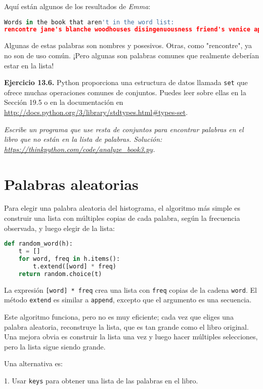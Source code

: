 Aquí están algunos de los resultados de \textit{Emma}:

\begin{lstlisting}[language=Python]
Words in the book that aren't in the word list:
rencontre jane's blanche woodhouses disingenuousness friend's venice apartment ...
\end{lstlisting}

Algunas de estas palabras son nombres y posesivos. Otras, como "rencontre", ya no son de uso común. ¡Pero algunas son palabras comunes que realmente deberían estar en la lista!

\textbf{Ejercicio 13.6.} Python proporciona una estructura de datos llamada \texttt{set} que ofrece muchas operaciones comunes de conjuntos. Puedes leer sobre ellas en la Sección 19.5 o en la documentación en \url{http://docs.python.org/3/library/stdtypes.html#types-set}.

\textit{Escribe un programa que use resta de conjuntos para encontrar palabras en el libro que no están en la lista de palabras. Solución: \url{https://thinkpython.com/code/analyze_book3.py}.}

\section{Palabras aleatorias}

Para elegir una palabra aleatoria del histograma, el algoritmo más simple es construir una lista con múltiples copias de cada palabra, según la frecuencia observada, y luego elegir de la lista:

\begin{lstlisting}[language=Python]
def random_word(h):
    t = []
    for word, freq in h.items():
        t.extend([word] * freq)
    return random.choice(t)
\end{lstlisting}

La expresión \texttt{[word] * freq} crea una lista con \texttt{freq} copias de la cadena \texttt{word}. El método \texttt{extend} es similar a \texttt{append}, excepto que el argumento es una secuencia.

Este algoritmo funciona, pero no es muy eficiente; cada vez que eliges una palabra aleatoria, reconstruye la lista, que es tan grande como el libro original. Una mejora obvia es construir la lista una vez y luego hacer múltiples selecciones, pero la lista sigue siendo grande.

Una alternativa es:

1. Usar \texttt{keys} para obtener una lista de las palabras en el libro.


